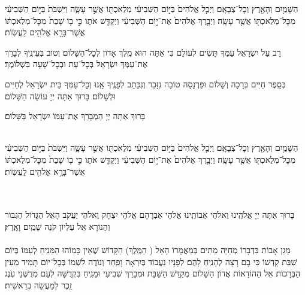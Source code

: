 \documentclass[twoside, openany, parskip=half, 11pt]{book}
\begin{document}
הַשָּׁמַ֥יִם וְהָאָ֖רֶץ וְכׇל־צְבָאָֽם׃ וַיְכַ֤ל אֱלֹהִים֙ בַּיּ֣וֹם הַשְּׁבִיעִ֔י מְלַאכְתּ֖וֹ אֲשֶׁ֣ר עָשָׂ֑ה וַיִּשְׁבֹּת֙ בַּיּ֣וֹם הַשְּׁבִיעִ֔י מִכׇּל־מְלַאכְתּ֖וֹ אֲשֶׁ֥ר עָשָֽׂה׃ וַיְבָ֤רֶךְ אֱלֹהִים֙ אֶת־י֣וֹם הַשְּׁבִיעִ֔י וַיְקַדֵּ֖שׁ אֹת֑וֹ כִּ֣י ב֤וֹ שָׁבַת֙ מִכׇּל־מְלַאכְתּ֔וֹ אֲשֶׁר־בָּרָ֥א אֱלֹהִ֖ים לַֽעֲשֽׂוֹת׃

\shabboskiddushhayom{}

\sepline

\label{maarivyt}
\ytkiddushhayom{\YTShabboshavdalah}


\sepline

\retzeh

\yaalehveyavo

\zion

\maarivmodim

\shabboschanukah

\shabboshodos

רָב עַל יִשְׂרָאֵל עַמְּךָ תָּשִׂים לְעוֹלָם כִּי אַתָּה הוּא מֶֽלֶךְ אָדוֹן לְכׇל־הַשָּׁלוֹם׃ וְטוֹב בְּעֵינֶֽיךָ לְבָרֵךְ אֶת־עַמְּךָ יִשְׂרָאֵל בְּכׇל־עֵת וּבְכׇל־שָׁעָה בִּשְׁלוֹמֶךָ׃
\vspace{-0.4\baselineskip}
\begin{paracol}{2}

\begin{small}
בְּסֵֽפֶר חַיִּים בְּרָכָה וְשָׁלוֹם וּפַרְנָסָה טוֹבָה נִזָּכֵר וְנִכָּתֵב לְפָנֶֽיךָ אָֽנוּ וְכׇל־עַמְּךָ בֵּית יִשְׂרָאֵל לְחַיִּים וּלְשָׁלוֹם׃ בָּרוּךְ אַתָּה יְיָ עוֹשֵׂה הַשָּׁלוֹם׃
\end{small}


\switchcolumn

בָּרוּךְ אַתָּה יְיָ הַמְבָרֵךְ אֶת־עַמּוֹ יִשְׂרָאֵל בַּשָּׁלוֹם׃

\end{paracol}

\tachanunim


\label{vayachulu}
\\
 הַשָּׁמַ֥יִם וְהָאָ֖רֶץ וְכׇל־צְבָאָֽם׃ וַיְכַ֤ל אֱלֹהִים֙ בַּיּ֣וֹם הַשְּׁבִיעִ֔י מְלַאכְתּ֖וֹ אֲשֶׁ֣ר עָשָׂ֑ה וַיִּשְׁבֹּת֙ בַּיּ֣וֹם הַשְּׁבִיעִ֔י מִכׇּל־מְלַאכְתּ֖וֹ אֲשֶׁ֥ר עָשָֽׂה׃ וַיְבָ֤רֶךְ אֱלֹהִים֙ אֶת־י֣וֹם הַשְּׁבִיעִ֔י וַיְקַדֵּ֖שׁ אֹת֑וֹ כִּ֣י ב֤וֹ שָׁבַת֙ מִכׇּל־מְלַאכְתּ֔וֹ אֲשֶׁר־בָּרָ֥א אֱלֹהִ֖ים לַֽעֲשֽׂוֹת׃


\\
\\
בָּרוּךְ אַתָּה יְיָ אֱלֹהֵֽינוּ וֵאלֹהֵי אֲבוֹתֵֽינוּ אֱלֹהֵי אַבְרָהָם אֱלֹהֵי יִצְחָק וֵאלֹהֵי יַעֲקֹב הָאֵל הַגָּדוֹל הַגִּבּוֹר וְהַנּוֹרָא אֵל עֶלְיוֹן קֹנֵה שָׁמַֽיִם וָאָֽרֶץ׃\\
\\
מָגֵן אָבוֹת בִּדְבָרוֹ מְחַיֵּה מֵתִים בְּמַאֲמָרוֹ הָאֵל
( הַמֶּֽלֶךְ)
הַקָּדוֹשׁ שֶׁאֵין כָּמֽוֹהוּ הַמֵּנִֽיחַ לְעַמּוֹ בְּיוֹם שַׁבַּת קָדְשׁוֹ כִּי בָם רָצָה לְהָנִֽיחַ לָהֶם׃ לְפָנָיו נַעֲבוֹד בְּיִרְאָה וָפַֽחַד וְנוֹדֶה לִשְׁמוֹ בְּכׇל־יוֹם תָּמִיד מֵעֵין הַבְּרָכוֹת׃ אֵל הַהוֹדָאוֹת אֲדוֹן הַשָּׁלוֹם מְקַדֵּשׁ הַשַּׁבָּת וּמְבָרֵךְ שְׁבִיעִי וּמֵנִֽיחַ בִּקְדֻשָּׁה לְעַם מְדֻשְּׁנֵי עֹֽנֶג זֵֽכֶר לְמַעֲשֵׂה בְרֵאשִׁית׃
\end{document}
